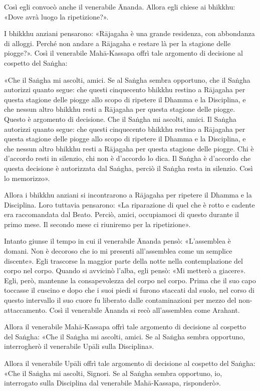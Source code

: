Così egli convocò anche il venerabile Ānanda. Allora egli chiese ai
bhikkhu: «Dove avrà luogo la ripetizione?».


I bhikkhu anziani pensarono: «Rājagaha è una grande residenza, con
abbondanza di alloggi. Perché non andare a Rājagaha e restare là per la
stagione delle piogge?». Così il venerabile Mahā-Kassapa offrì tale
argomento di decisione al cospetto del Saṅgha:


«Che il Saṅgha mi ascolti, amici. Se al Saṅgha sembra opportuno, che il
Saṅgha autorizzi quanto segue: che questi cinquecento bhikkhu restino a
Rājagaha per questa stagione delle piogge allo scopo di ripetere il
Dhamma e la Disciplina, e che nessun altro bhikkhu resti a Rājagaha per
questa stagione delle piogge. Questo è argomento di decisione. Che il
Saṅgha mi ascolti, amici. Il Saṅgha autorizzi quanto segue: che questi
cinquecento bhikkhu restino a Rājagaha per questa stagione delle piogge
allo scopo di ripetere il Dhamma e la Disciplina, e che nessun altro
bhikkhu resti a Rājagaha per questa stagione delle piogge. Chi è
d’accordo resti in silenzio, chi non è d’accordo lo dica. Il Saṅgha è
d’accordo che questa decisione è autorizzata dal Saṅgha, perciò il
Saṅgha resta in silenzio. Così lo memorizzo».


Allora i bhikkhu anziani si incontrarono a Rājagaha per ripetere il
Dhamma e la Disciplina. Loro tuttavia pensarono: «La riparazione di quel
che è rotto e cadente era raccomandata dal Beato. Perciò, amici,
occupiamoci di questo durante il primo mese. Il secondo mese ci
riuniremo per la ripetizione».


Intanto giunse il tempo in cui il venerabile Ānanda pensò: «L’assemblea
è domani. Non è decoroso che io mi presenti all’assemblea come un
semplice discente». Egli trascorse la maggior parte della notte nella
contemplazione del corpo nel corpo. Quando si avvicinò l’alba, egli
pensò: «Mi metterò a giacere». Egli, però, mantenne la consapevolezza
del corpo nel corpo. Prima che il suo capo toccasse il cuscino e dopo
che i suoi piedi si furono staccati dal suolo, nel corso di questo
intervallo il suo cuore fu liberato dalle contaminazioni per mezzo del
non-attaccamento. Così il venerabile Ānanda si recò all’assemblea come
Arahant.


Allora il venerabile Mahā-Kassapa offrì tale argomento di decisione al
cospetto del Saṅgha: «Che il Saṅgha mi ascolti, amici. Se al Saṅgha
sembra opportuno, interrogherò il venerabile Upāli sulla Disciplina».


Allora il venerabile Upāli offrì tale argomento di decisione al cospetto
del Saṅgha: «Che il Saṅgha mi ascolti, Signori. Se al Saṅgha sembra
opportuno, io, interrogato sulla Disciplina dal venerabile Mahā-Kassapa,
risponderò».


